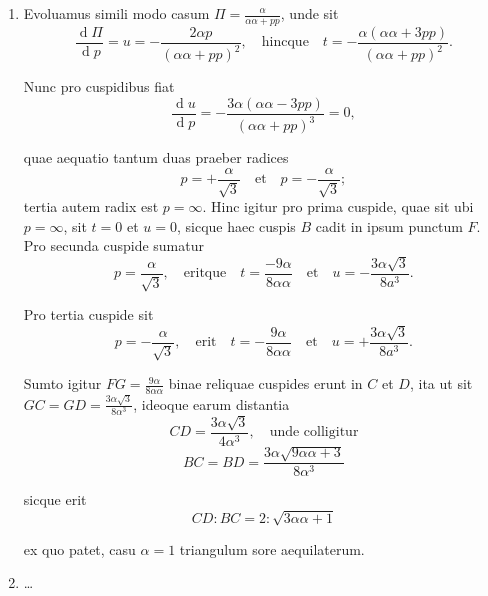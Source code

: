 \documentclass[10pt,a4paper]{article}
\newcommand{\switchenum}{\setcounter{enumi}{\arabic{enumi}-1}\switchcolumn}
\begin{document}
\begin{paracol}{2}
\begin{enumerate}[topsep=1px]
		\item Evoluamus simili modo casum $\Pi = \frac{\alpha}{\alpha\alpha + pp}$, unde sit
		\[
			\frac{\operatorname{d}\Pi}{\operatorname{d}p} = u = -\frac{2\alpha p}{(\alpha \alpha + pp)^2}, \quad \text{hincque}\quad t = -\frac{\alpha(\alpha \alpha+ 3pp)}{(\alpha \alpha +pp)^2}.
		\]
		\par Nunc pro cuspidibus fiat
		\[
			\frac{\operatorname{d}u}{\operatorname{d}p} = -\frac{3\alpha(\alpha\alpha- 3pp)}{(\alpha\alpha+ pp)^3} = 0,
		\]
		\par quae aequatio tantum duas praeber radices
		\[
			p = +\frac{\alpha}{\sqrt{3}} \quad \text{et} \quad p = -\frac{\alpha}{\sqrt{3}};
		\]
		tertia autem radix est $p=\infty$. Hinc igitur pro prima cuspide, quae sit ubi $p=\infty$, sit $t=0$ et $u=0$, sicque haec cuspis $B$ cadit in ipsum punctum $F$. Pro secunda cuspide sumatur
		\[
			p = \frac{\alpha}{\sqrt{3}}, \quad \text{eritque}\quad t = \frac{-9\alpha}{8\alpha \alpha} \quad \text{et} \quad u=-\frac{3\alpha \sqrt{3}}{8a^3}.
		\]
		\par Pro tertia cuspide sit
		\[
			p = -\frac{\alpha}{\sqrt{3}}, \quad \text{erit} \quad t = -\frac{9\alpha}{8\alpha \alpha} \quad \text{et} \quad u=+\frac{3\alpha \sqrt{3}}{8a^3}.
		\]
		\par Sumto igitur $FG = \frac{9\alpha}{8\alpha \alpha}$ binae reliquae cuspides erunt in $C$ et $D$, ita ut sit $GC = GD = \frac{3\alpha \sqrt{3}}{8\alpha^3}$, ideoque earum distantia
		\[
			CD = \frac{3\alpha \sqrt{3}}{4\alpha^3}, \quad \text{unde colligitur}
		\]
		\[
			BC = BD = \frac{3\alpha \sqrt{9\alpha \alpha+3}}{8\alpha^3}
		\]
		\par sicque erit
		\[
			CD : BC = 2:\sqrt{3\alpha\alpha + 1}
		\]
		\par ex quo patet, casu $\alpha = 1$ triangulum sore aequilaterum.
		
		\switchenum
		\item \ldots
		\switchcolumn*	
		

\end{enumerate}
\end{paracol}
\end{document}
